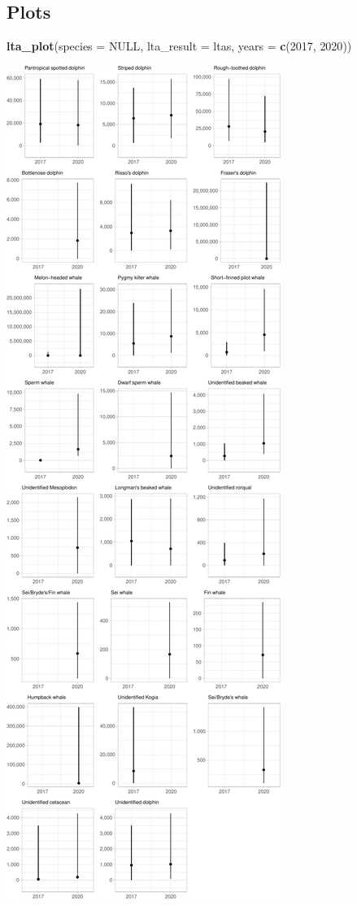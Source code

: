 \documentclass[
]{book}
\newenvironment{Shaded}{\begin{snugshade}}{\end{snugshade}}
\newcommand{\DataTypeTok}[1]{\textcolor[rgb]{0.13,0.29,0.53}{#1}}
\newcommand{\DecValTok}[1]{\textcolor[rgb]{0.00,0.00,0.81}{#1}}
\newcommand{\KeywordTok}[1]{\textcolor[rgb]{0.13,0.29,0.53}{\textbf{#1}}}
\newcommand{\NormalTok}[1]{#1}
\newcommand{\OtherTok}[1]{\textcolor[rgb]{0.56,0.35,0.01}{#1}}
\begin{document}
\hypertarget{plots-1}{%
\subsection*{Plots}\label{plots-1}}

\begin{Shaded}
\begin{Highlighting}[]
\KeywordTok{lta_plot}\NormalTok{(}\DataTypeTok{species =} \OtherTok{NULL}\NormalTok{, }
         \DataTypeTok{lta_result =}\NormalTok{ ltas, }
         \DataTypeTok{years =} \KeywordTok{c}\NormalTok{(}\DecValTok{2017}\NormalTok{, }\DecValTok{2020}\NormalTok{))}
\end{Highlighting}
\end{Shaded}

\includegraphics{figures/unnamed-chunk-309-1.pdf}
\end{document}
